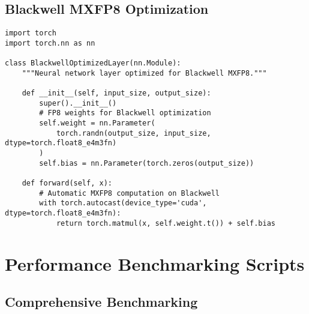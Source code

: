 \documentclass[11pt,a4paper]{article}
\begin{document}
\subsection{Blackwell MXFP8 Optimization}

\begin{lstlisting}[caption=Blackwell MXFP8 Matrix Multiplication]
import torch
import torch.nn as nn

class BlackwellOptimizedLayer(nn.Module):
    """Neural network layer optimized for Blackwell MXFP8."""

    def __init__(self, input_size, output_size):
        super().__init__()
        # FP8 weights for Blackwell optimization
        self.weight = nn.Parameter(
            torch.randn(output_size, input_size, dtype=torch.float8_e4m3fn)
        )
        self.bias = nn.Parameter(torch.zeros(output_size))

    def forward(self, x):
        # Automatic MXFP8 computation on Blackwell
        with torch.autocast(device_type='cuda', dtype=torch.float8_e4m3fn):
            return torch.matmul(x, self.weight.t()) + self.bias
\end{lstlisting}

\section{Performance Benchmarking Scripts}

\subsection{Comprehensive Benchmarking}
\end{document}
